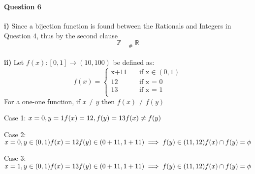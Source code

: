 \documentclass{article}
\date{January 2019}
\begin{document}
\maketitle
\textbf{Question 6}\\ \\
\textbf{i)}
Since a bijection function is found between the Rationals and Integers in Question 4, thus by the second clause \begin{equation}
    \mathbb{Z} =_{\#} \mathbb{R}
\end{equation}
\\
\textbf{ii)}
Let \begin{math}
f(x): [0,1] \to (10, 100)
\end{math}  be defined as:
\begin{equation}
f(x) = 
     \begin{cases}
       \text{x+11} &\quad\text{if x} \in (0, 1)\\
       \text{12} &\quad\text{if x = 0} \\
       \text{13} &\quad\text{if x = 1} \\
     \end{cases}
\end{equation}
For a one-one function, if \begin{math}
x \neq y
\end{math} then \begin{math}
f(x) \neq f(y)
\end{math}

Case 1:
\begin{math}
x=0, y=1 \\ 
f(x)=12, f(y)=13 \\
f(x) \neq f(y) \\
\end{math}

Case 2: 
\begin{math}
x=0, y \in (0, 1) \\ 
f(x)=12\\
f(y) \in (0+11, 1+11) \implies f(y) \in (11, 12) \\
f(x) \cap f(y) = \phi \\
\end{math}
    

Case 3: 
\begin{math}
x=1, y \in (0, 1) \\ 
f(x)=13\\
f(y) \in (0+11, 1+11) \implies f(y) \in (11, 12) \\
f(x) \cap f(y) = \phi \\
\end{math}
    
\end{document}
